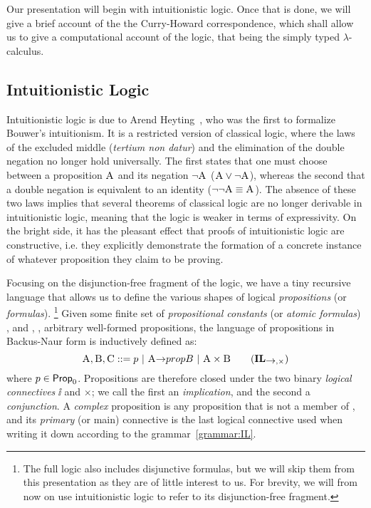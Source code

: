 Our presentation will begin with intuitionistic logic. 
Once that is done, we will give a brief account of the the Curry-Howard correspondence, which shall allow us to give a computational account of the logic, that being the simply typed $\lambda$-calculus.

\subsection{Intuitionistic Logic}
\label{subsection:intuitionistic_logic}
Intuitionistic logic is due to Arend Heyting~\cite{heyting1930}, who was the first to formalize Bouwer's intuitionism.
It is a restricted version of classical logic, where the laws of the excluded middle (\textit{tertium non datur}) and the elimination of the double negation no longer hold universally.
The first states that one must choose between a proposition $\prop{A}$ and its negation $\neg \prop{A}$ ($\prop{A} \vee \neg \prop{A}$), whereas the second that a double negation is equivalent to an identity ($\neg \neg \prop{A} \equiv \prop{A}$).
The absence of these two laws implies that several theorems of classical logic are no longer derivable in intuitionistic logic, meaning that the logic is weaker in terms of expressivity.
On the bright side, it has the pleasant effect that proofs of intuitionistic logic are constructive, i.e. they explicitly demonstrate the formation of a concrete instance of whatever proposition they claim to be proving.

Focusing on the disjunction-free fragment of the logic, we have a tiny recursive language that allows us to define the various shapes of logical \textit{propositions} (or \textit{formulas}).%
\footnote{The full logic also includes disjunctive formulas, but we will skip them from this presentation as they are of little interest to us. For brevity, we will from now on use intuitionistic logic to refer to its disjunction-free fragment.}
Given some finite set of \textit{propositional constants} (or \textit{atomic formulas}) \propcon{}, and , ,  arbitrary well-formed propositions, the language of propositions in Backus-Naur form is inductively defined as:
\begin{equation}
\prop{A}, \prop{B}, \prop{C} ::= p \ | \ \prop{A} \ii \\prop{B} \ | \ \prop{A} \times \prop{B} 
\tag{$\IL_{\ii, \times}$}
\label{grammar:IL}
\end{equation}
where $p \in \mathsf{Prop}_0{}$.
Propositions are therefore closed under the two binary \textit{logical connectives} $\ii$ and $\times$; we call the first an \textit{implication}, and the second a \textit{conjunction}. 
A \textit{complex} proposition is any proposition that is not a member of \propcon{}, and its \textit{primary} (or main) connective is the last logical connective used when writing it down according to the grammar~\ref{grammar:IL}.

